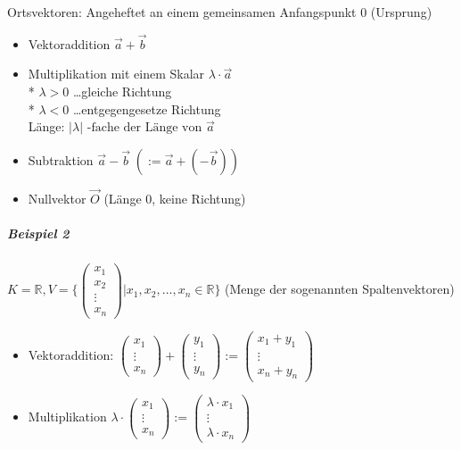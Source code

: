 \documentclass[a4paper]{scrartcl}
\begin{document}
Ortsvektoren: Angeheftet an einem gemeinsamen Anfangspunkt $0$ (Ursprung)

\begin{itemize}
\item Vektoraddition $\vec{a} + \vec{b}$
\item Multiplikation mit einem Skalar $\lambda \cdot \vec{a}$\\*
$\lambda > 0$ \dots gleiche Richtung\\*
$\lambda < 0$ \dots entgegengesetze Richtung\\
Länge: $\lvert \lambda \rvert \text{ -fache der Länge von }\vec{a}$
\item Subtraktion $\vec{a} - \vec{b} \;(:= \vec{a} + (-\vec{b}))$
\item Nullvektor $\vec{O}$ (Länge 0, keine Richtung)
\end{itemize}

\subparagraph{Beispiel 2} $K = \mathbb{R}, V=\{ 
\begin{pmatrix} x_1 \\ x_2 \\ \vdots \\ x_n \end{pmatrix} \vert x_1,x_2,\dots ,x_n \in \mathbb{R} \}$ (Menge der sogenannten Spaltenvektoren)
\begin{itemize}
\item Vektoraddition: $\begin{pmatrix} x_1\\ \vdots\\ x_n\end{pmatrix} + \begin{pmatrix} y_1\\ \vdots \\ y_n\end{pmatrix} := \begin{pmatrix} x_1 + y_1\\ \vdots \\ x_n + y_n\end{pmatrix}$
\item Multiplikation $\lambda \cdot \begin{pmatrix} x_1\\ \vdots\\ x_n\end{pmatrix} := \begin{pmatrix} \lambda \cdot x_1\\ \vdots\\ \lambda \cdot x_n\end{pmatrix}$
\end{itemize}
\end{document}
